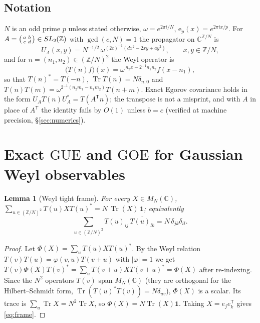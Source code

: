 \documentclass[11pt,reqno]{amsart}
\newtheorem{lemma}[theorem]{Lemma}
\theoremstyle{definition}
\DeclareMathOperator{\Tr}{Tr}
\newcommand{\ZZ}{\mathbb{Z}}
\newcommand{\CC}{\mathbb{C}}
\newcommand{\ep}{\mathrm{e}_p}
\newcommand{\GUE}{\mathrm{GUE}}
\newcommand{\GOE}{\mathrm{GOE}}
\begin{document}
\subsection*{Notation}
$N$ is an odd prime $p$ unless stated otherwise, $\omega=e^{2\pi i/N}$,
$\ep(x)=e^{2\pi i x/p}$. For $A=\begin{psmallmatrix}a&b\\c&d\end{psmallmatrix}
\in SL_2(\ZZ)$ with $\gcd(c,N)=1$ the propagator on $\CC^{\ZZ/N}$ is
\begin{equation}\label{eq:UA}
  U_A(x,y)=N^{-1/2}\,\omega^{(2c)^{-1}(dx^2-2xy+ay^2)},
  \qquad x,y\in\ZZ/N,
\end{equation}
and for $n=(n_1,n_2)\in(\ZZ/N)^2$ the Weyl operator is
\begin{equation}\label{eq:Tn}
  \bigl(T(n)f\bigr)(x)=\omega^{\,n_2x-2^{-1}n_1n_2}f(x-n_1),
\end{equation}
so that $T(n)^*=T(-n)$, $\Tr T(n)=N\delta_{n,0}$ and
$T(n)T(m)=\omega^{2^{-1}(n_2m_1-n_1m_2)}T(n+m)$. Exact Egorov covariance holds
in the form $U_AT(n)U_A^*=T(A^{\mathsf T}n)$; the transpose is not a
misprint, and with $A$ in place of $A^{\mathsf T}$ the identity fails by $O(1)$
unless $b=c$ (verified at machine precision, \S\ref{sec:numerics}).


\section{Exact \texorpdfstring{$\GUE$}{GUE} and \texorpdfstring{$\GOE$}{GOE}
for Gaussian Weyl observables}\label{sec:thmA}

\begin{lemma}[Weyl tight frame]\label{lem:frame}
For every $X\in M_N(\CC)$,
$\sum_{u\in(\ZZ/N)^2}T(u)XT(u)^*=N\,\Tr(X)\,\mathbf 1$; equivalently
\begin{equation}\label{eq:frame}
  \sum_{u\in(\ZZ/N)^2}T(u)_{ij}\,\overline{T(u)_{lk}}=N\,\delta_{jk}\delta_{il}.
\end{equation}
\end{lemma}

\begin{proof}
Let $\Phi(X)=\sum_uT(u)XT(u)^*$. By the Weyl relation
$T(v)T(u)=\varphi(v,u)T(v+u)$ with $|\varphi|=1$ we get
$T(v)\Phi(X)T(v)^*=\sum_u T(v+u)XT(v+u)^*=\Phi(X)$ after re-indexing. Since the
$N^2$ operators $T(v)$ span $M_N(\CC)$ (they are orthogonal for the
Hilbert--Schmidt form, $\Tr(T(u)^*T(v))=N\delta_{uv}$), $\Phi(X)$ is a scalar.
Its trace is $\sum_u\Tr X=N^2\Tr X$, so $\Phi(X)=N\Tr(X)\mathbf 1$. Taking
$X=e_je_k^{\mathsf T}$ gives \eqref{eq:frame}.
\end{proof}
\end{document}
